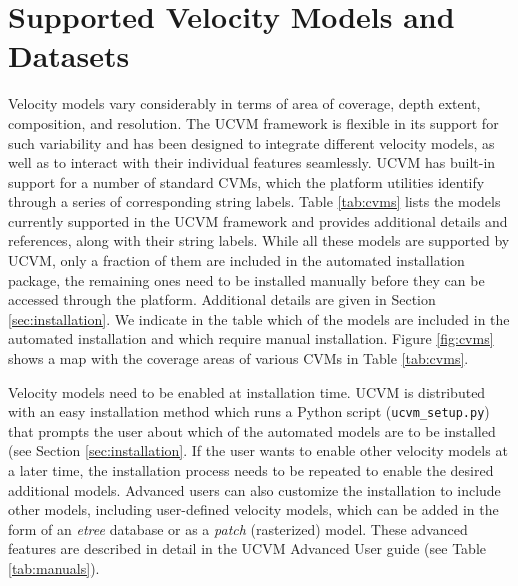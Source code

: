 



\section{Supported Velocity Models and Datasets}
\label{sec:cvms}

Velocity models vary considerably in terms of area of coverage, depth extent, composition, and resolution. The UCVM framework is flexible in its support for such variability and has been designed to integrate different velocity models, as well as to interact with their individual features seamlessly. UCVM has built-in support for a number of standard CVMs, which the platform utilities identify through a series of corresponding string labels. Table \ref{tab:cvms} lists the models currently supported in the UCVM framework and provides additional details and references, along with their string labels. While all these models are supported by UCVM, only a fraction of them are included in the automated installation package, the remaining ones need to be installed manually before they can be accessed through the platform. Additional details are given in Section \ref{sec:installation}. We indicate in the table which of the models are included in the automated installation and which require manual installation. Figure \ref{fig:cvms} shows a map with the coverage areas of various CVMs in Table \ref{tab:cvms}.

Velocity models need to be enabled at installation time. UCVM is distributed with an easy installation method which runs a Python script (\texttt{ucvm\_setup.py}) that prompts the user about which of the automated models are to be installed (see Section \ref{sec:installation}. If the user wants to enable other velocity models at a later time, the installation process needs to be repeated to enable the desired additional models. Advanced users can also customize the installation to include other models, including user-defined velocity models, which can be added in the form of an \textit{etree} \citep{Tu_2003_Tech} database or as a \textit{patch} (rasterized) model. These advanced features are described in detail in the UCVM Advanced User guide (see Table \ref{tab:manuals}).

